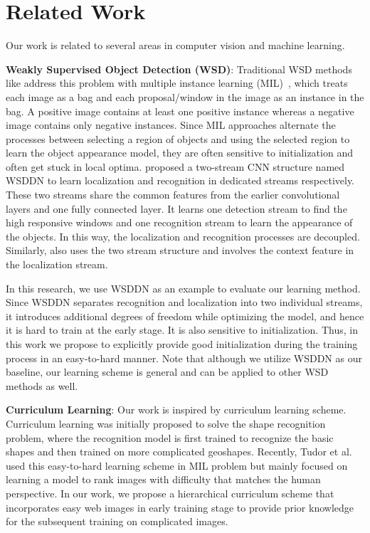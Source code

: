 \documentclass[10pt,twocolumn,letterpaper]{article}
\begin{document}
\section{Related Work}
\label{related}
Our work is related to several areas in computer vision and machine learning.

\textbf{Weakly Supervised Object Detection (WSD)}: Traditional WSD methods like \cite{cinbis2015weakly} address this problem with multiple instance learning (MIL)~\cite{dietterich1997solving}, which treats each image as a bag and each proposal/window in the image as an instance in the bag. A positive image contains at least one positive instance whereas a negative image contains only negative instances. Since MIL approaches alternate the processes between selecting a region of objects and using the selected region to learn the object appearance model, they are often sensitive to initialization and often get stuck in local optima. \cite{bilen2016weakly} proposed a two-stream CNN structure named WSDDN to learn localization and recognition in dedicated streams respectively. These two streams share the common features from the earlier convolutional layers and one fully connected layer. It learns one detection stream to find the high responsive windows and one recognition stream to learn the appearance of the objects. In this way, the localization and recognition processes are decoupled. Similarly, \cite{kantorov2016contextlocnet} also uses the two stream structure and involves the context feature in the localization stream.

In this research, we use WSDDN \cite{bilen2016weakly} as an example to evaluate our learning method. Since WSDDN separates recognition and localization into two individual streams, it introduces additional degrees of freedom while optimizing the model, and hence it is hard to train at the early stage. It is also sensitive to initialization. Thus, in this work we propose to explicitly provide good initialization during the training process in an easy-to-hard manner. Note that although we utilize WSDDN as our baseline, our learning scheme is general and can be applied to other WSD methods as well.


\textbf{Curriculum Learning}: Our work is inspired by curriculum learning \cite{bengio2009curriculum} scheme. Curriculum learning was initially proposed to solve the shape recognition problem, where the recognition model is first trained to recognize the basic shapes and then trained on more complicated geoshapes. Recently, Tudor et al.~\cite{tudor2016hard} used this easy-to-hard learning scheme in MIL problem but mainly focused on learning a model to rank images with difficulty that matches the human perspective. In our work, we propose a hierarchical curriculum scheme that incorporates easy web images in early training stage to provide prior knowledge for the subsequent training on complicated images.
\end{document}
